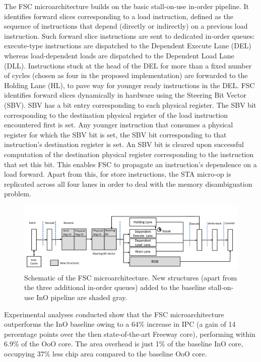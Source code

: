 \documentclass[a4paper,12pt, final]{report}
\begin{document}
The FSC microarchitecture builds on the basic stall-on-use in-order pipeline. It identifies forward slices corresponding to a load instruction, defined as the sequence of instructions that depend (directly or indirectly) on a previous load instruction. Such forward slice instructions are sent to dedicated in-order queues: execute-type instructions are dispatched to the Dependent Execute Lane (DEL) whereas load-dependent loads are dispatched to the Dependent Load Lane (DLL). Instructions stuck at the head of the DEL for more than a fixed number of cycles (chosen as four in the proposed implementation) are forwarded to the Holding Lane (HL), to pave way for younger ready instructions in the DEL. FSC identifies forward slices dynamically in hardware using the Steering Bit Vector (SBV). SBV has a bit entry corresponding to each physical register. The SBV bit corresponding to the destination physical register of the load instruction encountered first is set. Any younger instruction that consumes a physical register for which the SBV bit is set, the SBV bit corresponding to that instruction's destination register is set. An SBV bit is cleared upon successful computation of the destination physical register corresponding to the instruction that set this bit. This enables FSC to propagate an instruction's dependence on a load forward. Apart from this, for store instructions, the STA micro-op is replicated across all four lanes in order to deal with the memory disambiguation problem. 

\begin{figure}[H]
    \begin{center}
    \includegraphics[width=\linewidth]{august22/img/fsc.png}
    \caption{Schematic of the FSC microarchitecture. New structures (apart from the three additional in-order queues) added to the baseline stall-on-use InO pipeline are shaded gray.}
    \end{center}
\end{figure}

Experimental analyses conducted show that the FSC microarchitecture outperforms the InO baseline owing to a 64\% increase in IPC (a gain of 14 percentage points over the then state-of-the-art Freeway\cite{freeway} core), performing within 6.9\% of the OoO core. The area overhead is just 1\% of the baseline InO core, occupying 37\% less chip area compared to the baseline OoO core.
\end{document}
